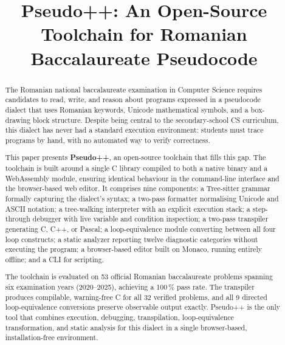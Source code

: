 \documentclass[conference]{IEEEtran}
\begin{document}
\title{Pseudo++: An Open-Source Toolchain for Romanian Baccalaureate Pseudocode}

\author{
  \and
}

\maketitle

\begin{abstract}
The Romanian national baccalaureate examination in Computer Science requires
candidates to read, write, and reason about programs expressed in a pseudocode
dialect that uses Romanian keywords, Unicode mathematical symbols, and a
box-drawing block structure.  Despite being central to the secondary-school CS
curriculum, this dialect has never had a standard execution environment:
students must trace programs by hand, with no automated way to verify
correctness.

This paper presents \textbf{Pseudo++}, an open-source toolchain that fills
this gap.  The toolchain is built around a single C library compiled to both a
native binary and a WebAssembly module, ensuring identical behaviour in the
command-line interface and the browser-based web editor.  It comprises nine
components: a Tree-sitter grammar formally capturing the dialect's syntax; a
two-pass formatter normalising Unicode and ASCII notation; a tree-walking
interpreter with an explicit execution stack; a step-through debugger with
live variable and condition inspection; a two-pass transpiler generating C,
C++, or Pascal; a loop-equivalence module converting between all four loop
constructs; a static analyzer reporting twelve diagnostic categories without
executing the program; a browser-based editor built on Monaco, running entirely offline; and a CLI
for scripting.

The toolchain is evaluated on 53 official Romanian baccalaureate problems
spanning six examination years (2020--2025), achieving a 100\,\% pass rate.
The transpiler produces compilable, warning-free C for all 32 verified
problems, and all 9 directed loop-equivalence conversions preserve observable
output exactly.  Pseudo++ is the only tool that combines execution, debugging,
transpilation, loop-equivalence transformation, and static analysis for this
dialect in a single browser-based, installation-free environment.
\end{abstract}
\end{document}
